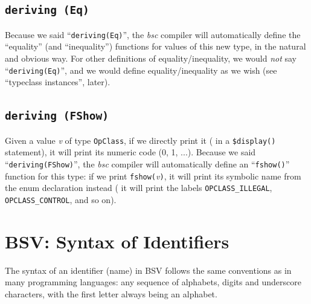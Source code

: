 
\subsection{{\tt deriving (Eq)}}


Because we said ``\verb|deriving(Eq)|'', the \emph{bsc} compiler will
automatically define the ``equality'' (and ``inequality'') functions
for values of this new type, in the natural and obvious way.  For
other definitions of equality/inequality, we would \emph{not} say
``\verb|deriving(Eq)|'', and we would define equality/inequality as we
wish (see ``typeclass instances'', later).


\subsection{{\tt deriving (FShow)}}


Given a value \emph{v} of type \verb|OpClass|, if we directly print it
({\eg} in a \verb|$display()| statement), it will print its numeric
code (0, 1, ...).  Because we said ``\verb|deriving(FShow)|'', the
\emph{bsc} compiler will automatically define an ``\verb|fshow()|''
function for this type: if we print \verb|fshow(|\emph{v}\verb|)|, it
will print its symbolic name from the enum declaration instead ({\ie}
it will print the labels \verb|OPCLASS_ILLEGAL|,
\verb|OPCLASS_CONTROL|, and so on).


\section{BSV: Syntax of Identifiers}

\label{BSV_Syntax_of_Identifiers}


The syntax of an identifier (name) in BSV follows the same conventions
as in many programming languages: any sequence of alphabets, digits
and underscore characters, with the first letter always being an
alphabet.


